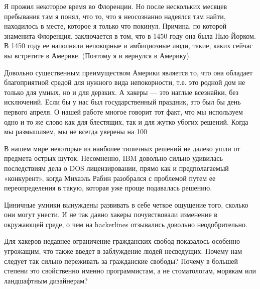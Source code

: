 \documentclass[ebook,12pt,oneside,openany]{memoir}
\begin{document}
Я прожил некоторое время во Флоренции. Но после нескольких месяцев
пребывания там я понял, что то, что я неосознанно надеялся там найти,
находилось в месте, которое я только что покинул. Причина, по которой
знаменита Флоренция, заключается в том, что в 1450 году она была
Нью-Йорком. В 1450 году ее наполняли непокорные и амбициозные люди,
такие, каких сейчас вы встретите в Америке. (Поэтому я и вернулся в
Америку).

Довольно существенным преимуществом Америки является то, что она
обладает благоприятной средой для нужного вида непокорности, т.е. это
родной дом не только для умных, но и для дерзких. А хакеры — это
наглые всезнайки, без исключений. Если бы у нас был государственный
праздник, это был бы день первого апреля. О нашей работе многое
говорит тот факт, что мы используем одно и то же слово как для
блестящих, так и для жутко убогих решений. Когда мы размышляем, мы не
всегда уверены на
100%

В нашем мире некоторые из наиболее типичных решений не далеко ушли от
предмета острых шуток. Несомненно, IBM довольно сильно удивилась
последствиям дела о DOS лицензировании, прямо как и предполагаемый
«конкурент», когда Михаэль Рабин разобрался с проблемой путем ее
переопределения в такую, которая уже проще подавалась решению.

Циничные умники вынуждены развивать в себе четкое ощущение того,
сколько они могут унести. И не так давно хакеры почувствовали
изменение в окружающей среде, о чем на hackerlines отзывались довольно
неодобрительно.

Для хакеров недавнее ограничение гражданских свобод показалось
особенно угрожащим, что также введет в заблуждение людей несведущих.
Почему нам следует так сильно переживать за гражданские свободы?
Почему в большей степени это свойственно именно программистам, а не
стоматологам, морякам или ландшафтным дизайнерам?
\end{document}
